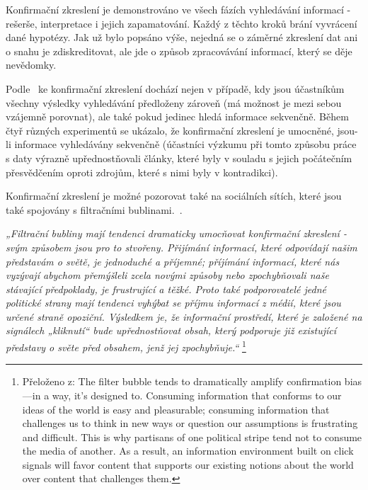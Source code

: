     Konfirmační zkreslení je demonstrováno ve všech fázích vyhledávání informací - rešerše, interpretace i jejich zapamatování. Každý z těchto kroků brání vyvrácení dané hypotézy. Jak už bylo popsáno výše, nejedná se o záměrné zkreslení dat ani o snahu je zdiskreditovat, ale jde o způsob zpracovávání informací, který se děje nevědomky.~\citep{pohl2004cognitive}
    
    Podle~\cite{Jonas2001ConfirmationBI} ke konfirmační zkreslení dochází nejen v případě, kdy jsou účastníkům všechny výsledky vyhledávání předloženy zároveň (má možnost je mezi sebou vzájemně porovnat), ale také pokud jedinec hledá informace sekvenčně. Během čtyř různých experimentů se ukázalo, že konfirmační zkreslení je umocněné, jsou-li informace vyhledávány sekvenčně (účastníci výzkumu při tomto způsobu práce s daty výrazně upřednostňovali články, které byly v souladu s jejich počátečním přesvědčením oproti zdrojům, které s nimi byly v kontradikci). 
    
    Konfirmační zkreslení je možné pozorovat také na sociálních sítích, které jsou také spojovány s filtračními bublinami.~\citep{kowald2018studying}. 
    
    \setlength\parskip{5mm}
    
    \textit{„Filtrační bubliny mají tendenci dramaticky umocňovat konfirmační zkreslení - svým způsobem jsou pro to stvořeny. Přijímání informací, které odpovídají našim představám o světě, je jednoduché a příjemné; příjímání informací, které nás vyzývají abychom přemýšleli zcela novými způsoby nebo zpochybňovali naše stávající předpoklady, je frustrující a těžké. Proto také podporovatelé jedné politické strany mají tendenci vyhýbat se příjmu informací z médií, které jsou určené straně opoziční. Výsledkem je, že informační prostředí, které je založené na signá\-lech „kliknutí“ bude upřednostňovat obsah, který podporuje již existující představy o světe před obsahem, jenž jej zpochybňuje.“} \footnote{Přeloženo z: The filter bubble tends to dramatically amplify confirmation bias—in a way, it’s designed to. Consuming information that conforms to our ideas of the world is easy and pleasurable; consuming information that challenges us to think in new ways or question our assumptions is frustrating and difficult. This is why partisans of one political stripe tend not to consume the media of another. As a result, an information environment built on click signals will favor content that supports our existing notions about the world over content that challenges them.}~\citep{Pariser2011} 
    
